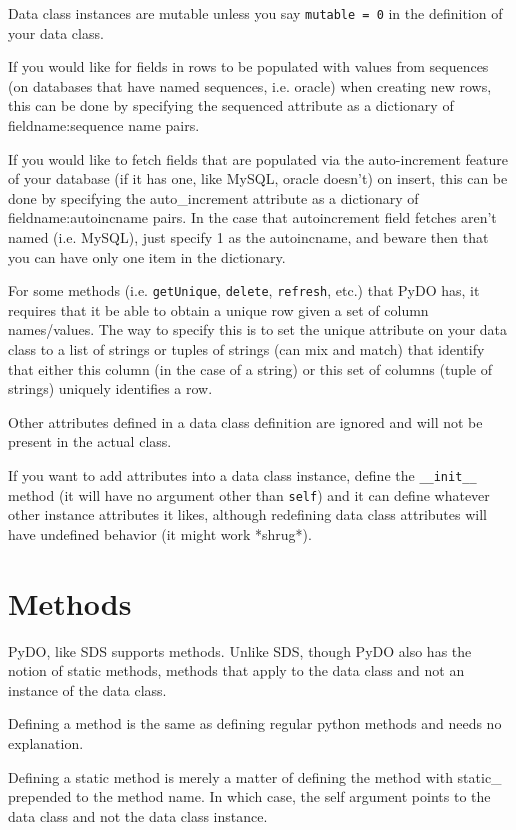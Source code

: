\documentclass[titlepage]{manual}
\begin{document}
Data class instances are mutable unless you say \texttt{mutable = 0}
in the definition of your data class.

If you would like for fields in rows to be populated with values from
sequences (on databases that have named sequences, i.e. oracle) when
creating new rows, this can be done by specifying the sequenced
attribute as a dictionary of fieldname:sequence name pairs. 

If you would like to fetch fields that are populated via
the auto-increment feature of your database (if it has one, like
MySQL, oracle doesn't) on insert, this can be done by specifying the
auto_increment attribute as a dictionary of fieldname:autoincname
pairs.  In the case that autoincrement field fetches aren't named
(i.e. MySQL), just specify 1 as the autoincname, and beware then that
you can have only one item in the dictionary.

For some methods (i.e. \texttt{getUnique}, \texttt{delete}, \texttt{refresh}, etc.) that PyDO
has, it requires that it be able to obtain a unique row given a set of
column names/values.  The way to specify this is to set the unique
attribute on your data class to a list of strings or tuples of strings
(can mix and match) that identify that either this column (in the case
of a string) or this set of columns (tuple of strings) uniquely
identifies a row.  

Other attributes defined in a data class definition are ignored and
will not be present in the actual class.

If you want to add attributes into a data class instance, define the
\texttt{__init__} method (it will have no argument other than
\texttt{self}) and it can define whatever other instance attributes it
likes, although redefining data class attributes will have undefined
behavior (it might work *shrug*).

\section{Methods}
PyDO, like SDS supports methods.  Unlike SDS, though PyDO also has the
notion of static methods, methods that apply to the data class and not
an instance of the data class.

Defining a method is the same as defining regular python methods and
needs no explanation.

Defining a static method is merely a matter of defining the method
with static_ prepended to the method name.  In which case, the self
argument points to the data class and not the data class instance.
\end{document}

